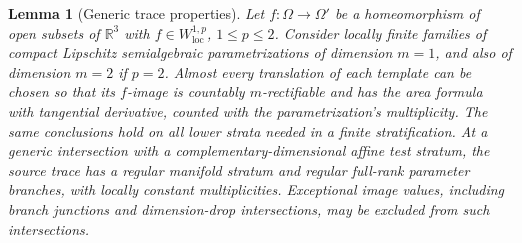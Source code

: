\documentclass[11pt]{article}
\numberwithin{equation}{section}
\newtheorem{lemma}[theorem]{Lemma}
\theoremstyle{definition}
\theoremstyle{remark}
\newcommand{\R}{\mathbb R}
\begin{document}
\begin{lemma}[Generic trace properties]
\label{lt:trace-slicing}
Let $f:\Omega\to\Omega'$ be a homeomorphism of open subsets of
$\R^3$ with $f\in W^{1,p}_{\mathrm{loc}}$, $1\leq p\leq2$.
Consider locally finite families of compact Lipschitz semialgebraic
parametrizations of dimension $m=1$, and also of dimension $m=2$ if
$p=2$.  Almost every translation of each template can be chosen so
that its $f$-image is countably $m$-rectifiable and has the area formula
with tangential derivative, counted with the parametrization's
multiplicity.  The same conclusions hold on all lower strata needed
in a finite stratification.  At a generic intersection with a
complementary-dimensional affine test stratum, the source trace has a
regular manifold stratum and regular full-rank parameter branches,
with locally constant multiplicities.  Exceptional image values,
including branch junctions and dimension-drop intersections, may be
excluded from such intersections.
\end{lemma}
\end{document}

